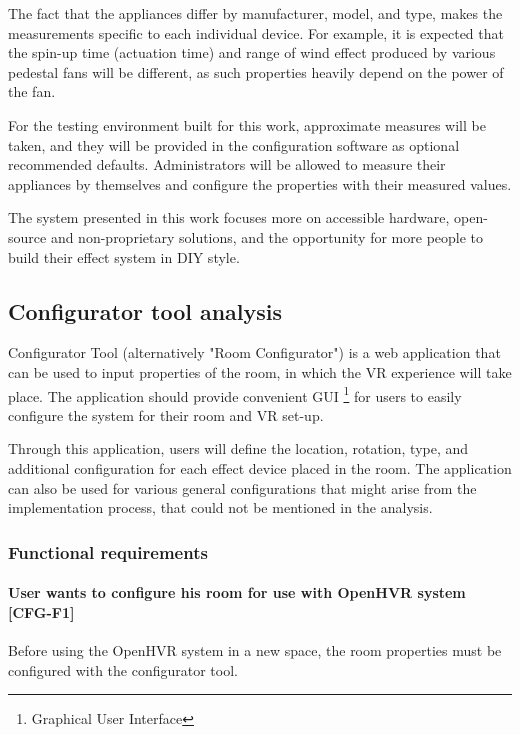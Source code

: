The fact that the appliances differ by manufacturer, model, and type,
makes the measurements specific to each individual device.
For example, it is expected that the spin-up time
(actuation time) and range of wind effect produced by various pedestal fans
will be different, as such properties heavily depend on the power of the fan.


For the testing environment built for this work, approximate measures will be
taken, and they will be provided in the configuration software as optional
recommended defaults. Administrators will be allowed
to measure their appliances by themselves and configure the properties with
their measured values.


The system presented in this work focuses more
on accessible hardware, open-source and non-proprietary solutions, and
the opportunity for more people to build their effect system in DIY style.


\hypertarget{x-configurator-tool-analysis}{\subsection*{Configurator tool analysis}}
Configurator Tool (alternatively "Room Configurator") is a web application that
can be used to
input properties of the room, in which the VR experience will take place.
The application should provide convenient GUI \footnote{Graphical User Interface}
for users to easily configure the system for their room and VR set-up.


Through this application, users will define the location, rotation, type, and
additional configuration for each effect device placed in the room. The application
can also be used for various general configurations that might arise from
the implementation process, that could not be mentioned in the analysis.


\hypertarget{x-functional-requirements}{\subsubsection*{Functional requirements}}
\hypertarget{x-\textbf{user-wants-to-configure-his-room-for-use-with-openhvr-system}-[cfg-f1]}{\paragraph*{\textbf{User wants to configure his room for use with OpenHVR system} [CFG-F1]}}
Before using the OpenHVR system in a new space,
the room properties must be configured with the configurator tool.


